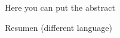 %
\label{sec:abstract}

Here you can put the abstract 

\vspace*{20mm}

{Resumen (different language)}
\label{sec:abstract-diff}

\blindtext
